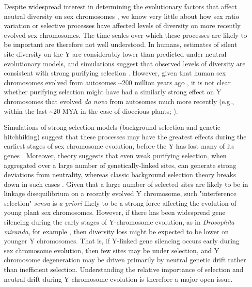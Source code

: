 \documentclass[9pt,twocolumn,twoside]{gsajnl}
\begin{document}
Despite widespread interest in determining the evolutionary factors that affect neutral diversity on sex chromosomes \citep{ellegren2011,bachtrog2013NRG}, we know very little about how sex ratio variation or selective processes have affected levels of diversity on more recently evolved sex chromosomes. The time scales over which these processes are likely to be important are therefore not well understood. In humans, estimates of silent site diversity on the Y are considerably lower than predicted under neutral evolutionary models, and simulations suggest that observed levels of diversity are consistent with strong purifying selection \citep{Wilsonsayres2014}. However, given that human sex chromosomes evolved from autosomes \textasciitilde 200 million years ago \citep{lahn1999four,ross2005dna}, it is not clear whether purifying selection might have had a similarly strong effect on Y chromosomes that evolved \textit{do novo} from autosomes much more recently (e.g., within the last \textasciitilde 20 MYA in the case of dioecious plants; \citealt{charlesworth2015plant}).

Simulations of strong selection models (background selection and genetic hitchhiking) suggest that these processes may have the greatest effects during the earliest stages of sex chromosome evolution, before the Y has lost many of its genes \citep{bachtrog2008temporal}. Moreover, theory suggests that even weak purifying selection, when aggregated over a large number of genetically-linked sites, can generate strong deviations from neutrality, whereas classic background selection theory breaks down in such cases \citep{mcvean2000, comeron2002population, KaiserCharlesworth, good2014genetic}. Given that a large number of selected sites are likely to be in linkage disequilibrium on a recently evolved Y chromosome, such "interference selection" \textit{sensu} \citep{good2014genetic} is \textit{a priori} likely to be a strong force affecting the evolution of young plant sex chromosomes. However, if there has been widespread gene silencing during the early stages of Y-chromosome evolution, as in \textit{Drosophila miranda}, for example \citep{zhou2012chromosome}, then diversity loss might be expected to be lower on younger Y chromosomes. That is, if Y-linked gene silencing occurs early during sex chromosome evolution, then few sites may be under selection, and Y chromosome degeneration may be driven primarily by neutral genetic drift rather than inefficient selection. Understanding the relative importance of selection and neutral drift during Y chromosome evolution is therefore a major open issue.
\end{document}
